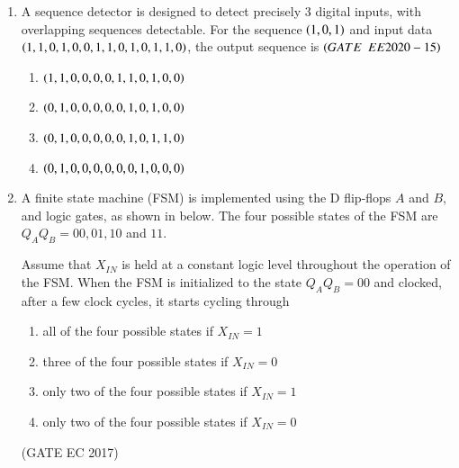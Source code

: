\begin{enumerate}[label=\arabic*.,ref=\theenumi]
\begin{enumerate}
\end{enumerate}

\item A sequence detector is designed to detect precisely $3$ digital inputs, with overlapping sequences detectable. For the sequence $\left(1,0,1\right)$ and input data $\left(1,1,0,1,0,0,1,1,0,1,0,1,1,0\right)$, the output sequence is
$\hfill\brak{GATE\enspace EE2020-15}$
   \begin{enumerate}
  \item  $\left(1,1,0,0,0,0,1,1,0,1,0,0\right)$
  \item $\left(0,1,0,0,0,0,0,1,0,1,0,0\right)$
  \item $\left(0,1,0,0,0,0,0,1,0,1,1,0\right)$
  \item $\left(0,1,0,0,0,0,0,0,1,0,0,0\right)$

\end{enumerate}

\item A finite state machine (FSM) is implemented using the D flip-flops $A$ and $B$, and logic gates, as shown in  
	below. The four possible states of the FSM are $Q_AQ_B = 00, 01, 10$ and	 $11$.  
%
\begin{figure}[H]
\centering
\resizebox{0.75\columnwidth}{!}{%
	
}%
	\caption{}
\label{fig:ide/fsm/figs/circuit}
\end{figure}
Assume that $X_{IN}$ is held at a constant logic level throughout the operation of the FSM. When the FSM is initialized to the state $Q_AQ_B = 00$ and clocked, after a few clock cycles, it starts cycling through
\begin{enumerate}
\item all of the four possible states if $X_{IN} = 1$
\item three of the four possible states if $X_{IN} = 0$
\item only two of the four possible states if $X_{IN} = 1$
\item only two of the four possible states if $X_{IN} = 0$
\end{enumerate}
\hfill{(GATE EC 2017)}

\end{enumerate}
